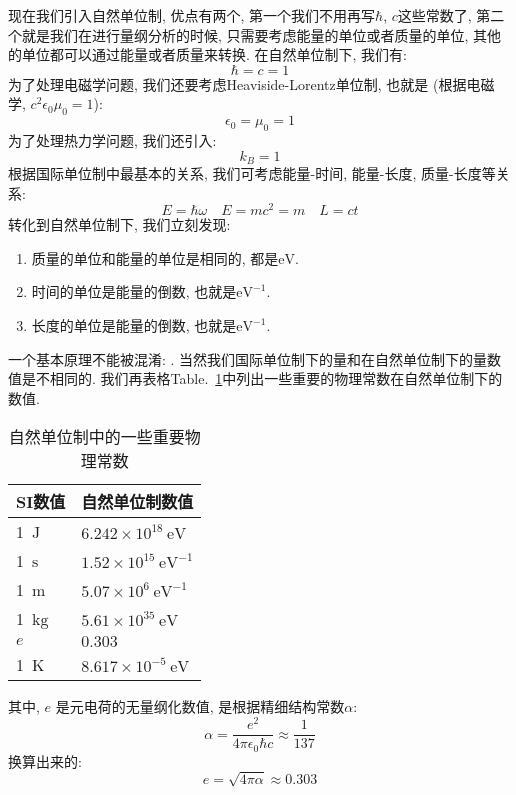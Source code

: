 现在我们引入自然单位制, 优点有两个, 第一个我们不用再写$\hbar$, $c$这些常数了, 第二个就是我们在进行量纲分析的时候, 只需要考虑能量的单位或者质量的单位, 其他的单位都可以通过能量或者质量来转换.
在自然单位制下, 我们有:
\begin{equation}
  \hbar = c = 1
\end{equation}
为了处理电磁学问题, 我们还要考虑Heaviside-Lorentz单位制, 也就是 (根据电磁学, $c^2 \epsilon_0 \mu_0 = 1$):
\begin{equation}
  \epsilon_0 = \mu_0 = 1
\end{equation}
为了处理热力学问题, 我们还引入:
\begin{equation}
  k_B = 1
\end{equation}
根据国际单位制中最基本的关系, 我们可考虑能量-时间, 能量-长度, 质量-长度等关系:
\begin{equation}
  E = \hbar \omega  \quad E = m c^2 = m \quad L=c t
\end{equation}
转化到自然单位制下, 我们立刻发现:
\begin{enumerate}
\item 质量的单位和能量的单位是相同的, 都是$\mathrm{eV}$.
\item 时间的单位是能量的倒数, 也就是$\mathrm{eV}^{-1}$.
\item 长度的单位是能量的倒数, 也就是$\mathrm{eV}^{-1}$.
\end{enumerate}
一个基本原理不能被混淆: .
当然我们国际单位制下的量和在自然单位制下的量数值是不相同的.
我们再表格Table.~\ref{tab:natural_units_physical_constants}中列出一些重要的物理常数在自然单位制下的数值.
\begin{table}[h!]
\centering
\begin{tabular}{|l|l|}
  \hline
  SI数值 & 自然单位制数值 \\
  \hline
  1~$\mathrm{J}$ & $6.242 \times 10^{18}~\mathrm{eV}$ \\
  1~$\mathrm{s}$ & $1.52 \times 10^{15}~\mathrm{eV}^{-1}$ \\
  1~$\mathrm{m}$ & $5.07 \times 10^{6}~\mathrm{eV}^{-1}$ \\
  1~$\mathrm{kg}$ & $5.61 \times 10^{35}~\mathrm{eV}$ \\
  $e$ & $0.303$ \\
  1~$\mathrm{K}$ & $8.617 \times 10^{-5}~\mathrm{eV}$ \\
  \hline
\end{tabular}
\caption{自然单位制中的一些重要物理常数}
\label{tab:natural_units_physical_constants}
\end{table}
其中, $e$ 是元电荷的无量纲化数值, 是根据精细结构常数$\alpha$:
\begin{equation}
  \alpha = \frac{e^2}{4\pi\epsilon_0 \hbar c} \approx \frac{1}{137}
\end{equation}
换算出来的:
\begin{equation}
  e = \sqrt{4\pi\alpha} \approx 0.303
\end{equation}

